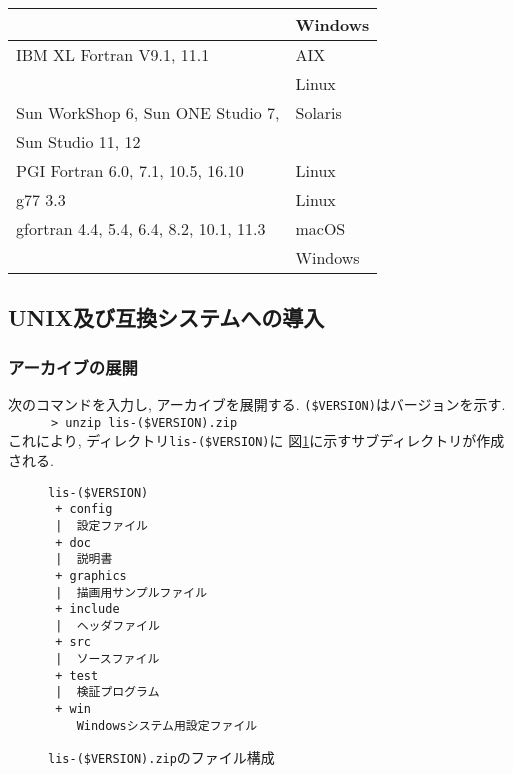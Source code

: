 \documentclass[a4paper]{jarticle}
\begin{document}
\begin{table}[htbp]
\begin{center}
{\begin{tabular}{l|l}
                                                  & Windows  \\
\hline
IBM XL Fortran V9.1, 11.1                  & AIX     \\
                                           & Linux   \\
\hline
Sun WorkShop 6, Sun ONE Studio 7,          & Solaris \\
Sun Studio 11, 12                          &         \\
\hline
PGI Fortran 6.0, 7.1, 10.5, 16.10          & Linux \\
\hline
g77 3.3                                    & Linux \\
gfortran 4.4, 5.4, 6.4, 8.2, 10.1, 11.3    & macOS \\
                                           & Windows \\
\hline
\end{tabular}
}
\end{center}
\end{table} 

\subsection{UNIX及び互換システムへの導入}
\subsubsection{アーカイブの展開}
次のコマンドを入力し, アーカイブを展開する. \verb|($VERSION)|はバージョンを示す. \\
\verb&      > unzip lis-($VERSION).zip &\\
これにより, ディレクトリ{\tt lis-(\$VERSION)}に
図\ref{listargz}に示すサブディレクトリが作成される. 

\begin{figure}[htbp]
\begin{center}
\begin{verbatim}
lis-($VERSION)
 + config
 |  設定ファイル
 + doc
 |  説明書
 + graphics
 |  描画用サンプルファイル
 + include
 |  ヘッダファイル
 + src
 |  ソースファイル
 + test
 |  検証プログラム
 + win
    Windowsシステム用設定ファイル
\end{verbatim}
\end{center}
\caption{{\tt lis-(\$VERSION).zip}のファイル構成}
\label{listargz}
\end{figure}
\end{document}
